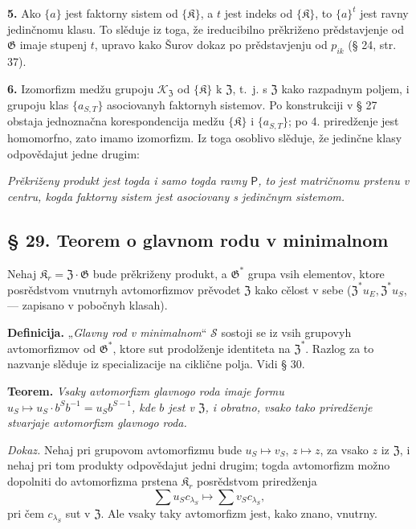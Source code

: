\documentclass[11pt]{article}
\begin{document}
\noindent\textbf{5.} Ako \(\{a\}\) jest faktorny sistem od \(\{\mathfrak K\}\), a \(t\) jest indeks od \(\{\mathfrak K\}\), to \(\{a\}^t\) jest ravny jedinčnomu klasu. To slěduje iz toga, že ireducibilno prěkriženo prědstavjenje od \(\mathfrak G\) imaje stupenj \(t\), upravo kako Šurov dokaz po prědstavjenju od \(p_{ik}\) (§ 24, str. 37).

\noindent\textbf{6.} Izomorfizm medžu grupoju \(\mathscr K_{\mathfrak Z}\) od \(\{\mathfrak K\}\) k \(\mathfrak Z\), t.~j. s \(\mathfrak Z\) kako razpadnym poljem, i grupoju klas \(\{a_{S,T}\}\) asociovanyh faktornyh sistemov. Po konstrukciji v § 27 obstaja jednoznačna korespondencija medžu \(\{\mathfrak K\}\) i \(\{a_{S,T}\}\); po 4. priredženje jest homomorfno, zato imamo izomorfizm. Iz toga osoblivo slěduje, že jedinčne klasy odpovědajut jedne drugim:

\noindent\emph{Prěkriženy produkt jest togda i samo togda ravny \(\mathsf{P}\), to jest matričnomu prstenu v centru, kogda faktorny sistem jest asociovany s jedinčnym sistemom.}

\subsection*{§ 29. Teorem o glavnom rodu v minimalnom}\label{hauptgeschlechtssatz-im-minimalen}

Nehaj \(\mathfrak K_r=\mathfrak Z\cdot\mathfrak G\) bude prěkriženy produkt, a \(\mathfrak G^*\) grupa vsih elementov, ktore posrědstvom vnutrnyh avtomorfizmov prěvodet \(\mathfrak Z\) kako cělost v sebe (\(\mathfrak Z^*u_E,\mathfrak Z^*u_S\), --- zapisano v pobočnyh klasah).

\noindent\textbf{Definicija.} „\emph{Glavny rod v minimalnom}“ \(\mathscr S\) sostoji se iz vsih grupovyh avtomorfizmov od \(\mathfrak G^*\), ktore sut prodolženje identiteta na \(\mathfrak Z^*\). Razlog za to nazvanje slěduje iz specializacije na ciklične polja. Vidi § 30.

\noindent\textbf{Teorem.} \emph{Vsaky avtomorfizm glavnogo roda imaje formu \(u_S\mapsto u_S\cdot b^Sb^{-1}=u_Sb^{S-1}\), kde \(b\) jest v \(\mathfrak Z\), i obratno, vsako tako priredženje stvarjaje avtomorfizm glavnogo roda.}

\noindent\emph{Dokaz.} Nehaj pri grupovom avtomorfizmu bude \(u_S\mapsto v_S\), \(z\mapsto z\), za vsako \(z\) iz \(\mathfrak Z\), i nehaj pri tom produkty odpovědajut jedni drugim; togda avtomorfizm možno dopolniti do avtomorfizma prstena \(\mathfrak K_r\) posrědstvom priredženja
\[
\sum u_Sc_{\lambda_S}\mapsto\sum v_Sc_{\lambda_S},
\]
pri čem \(c_{\lambda_S}\) sut v \(\mathfrak Z\). Ale vsaky taky avtomorfizm jest, kako znano, vnutrny.
\end{document}
